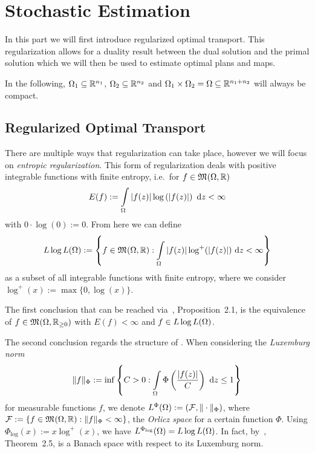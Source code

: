 \chapter{Stochastic Estimation}\label{DualPlanEst}

In this part we will first introduce regularized optimal transport. This regularization allows for a duality result between the dual solution and the primal solution which we will then be used to estimate optimal plans and maps.

In the following, $\Omega_1 \subseteq \R^{n_1}$, $\Omega_2 \subseteq \R^{n_2}$ and $\Omega_1 \times \Omega_2 = \Omega \subseteq \R^{n_1 + n_2}$ will always be compact.


\section{Regularized Optimal Transport}\label{RegOT}

There are multiple ways that regularization can take place, however we will focus on \textit{entropic regularization}. This form of regularization deals with positive integrable functions with finite entropy, i.e.~for $f \in \MF{\Omega}{\R}$
\[ E(f) := \int\limits_\Omega \vert f(z) \vert \log\left( \vert f(z) \vert \right)~\D[z] < \infty \]
with $0 \cdot \log(0) := 0$. From here we can define
\[ \LLL := \left\{ f \in \MF{\Omega}{\R} : \int\limits_\Omega \vert f(z) \vert \log^+(\vert f(z) \vert)~\D[z] < \infty \right\} \]
as a subset of all integrable functions with finite entropy, where we consider $\log^+(x) := \max \{ 0, \log (x) \}$.

The first conclusion that can be reached via~\cite{Cla2021}, Proposition~2.1, is the equivalence of $f \in \MF{\Omega}{\RZero}$ with $E(f) < \infty$ and $f \in \LLL$.

The second conclusion regards the structure of \LLL{}. When considering the \textit{Luxemburg norm}
\[ \Vert f \Vert_\Phi := \inf \left\{ C > 0 : \int\limits_\Omega \Phi\left( \frac{\vert f(z) \vert}{C} \right)~\D[z] \le 1 \right\} \]
for measurable functions $f$, we denote $\Orlicz{\Phi} := (\mathcal{F}, \Vert \cdot \Vert_\Phi)$, where $\mathcal{F} := \{ f \in \MF{\Omega}{\R} : \Vert f \Vert_\Phi < \infty \}$, the \textit{Orlicz space} for a certain function $\Phi$. Using $\Phi_{\log}(x) := x \log^+ (x)$, we have $\Orlicz{\Phi_{\log}} = \LLL$. In fact, by~\cite{Cla2021}, Theorem~2.5, \LLL{} is a Banach space with respect to its Luxemburg norm.


